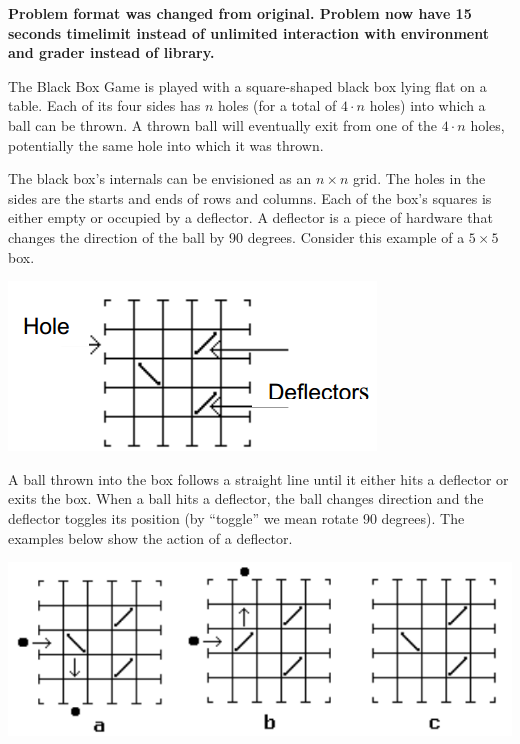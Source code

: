 {\bf Problem format was changed from original. Problem now have 15 seconds timelimit instead of unlimited interaction with environment and grader instead of library. }


The Black Box Game is played with a square-shaped black box lying flat on a table. Each of its four sides has $n$ holes (for a total of $4\cdot n$ holes) into which a ball can be thrown. A thrown ball will eventually exit from one of the $4\cdot n$ holes, potentially the same hole into which it was thrown. 

The black box's internals can be envisioned as an $n \times n$ grid. The 
holes in the sides are the starts and ends of rows and columns.  Each of the box's squares is either empty or occupied by a deflector. A deflector is a piece of hardware that changes the direction of the ball by 90 degrees. Consider this example of a $5 \times 5$ box. 

\begin{center}
\includegraphics[bb=0 0 275 110]{blackbox1.png}
\end{center}

A ball thrown into the box follows a straight line until it either hits a deflector or exits the box. When a ball hits a deflector, the ball changes direction and the deflector toggles its position (by ``toggle'' we mean rotate 90 degrees). The examples below show the action of a deflector. 

\begin{center}
\includegraphics[bb=0 0 600 150]{blackbox2.png}
\end{center}


